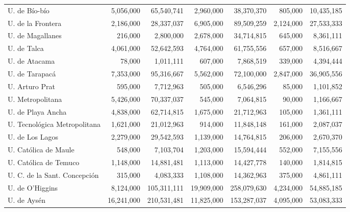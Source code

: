 \begin{tabular}{l rr rr rr}
U. de Bío-bío                  &     5,056,000 &      65,540,741 &     2,960,000 &      38,370,370 &       805,000 &      10,435,185 \\
U. de la Frontera              &     2,186,000 &      28,337,037 &     6,905,000 &      89,509,259 &     2,124,000 &      27,533,333 \\
U. de Magallanes               &       216,000 &       2,800,000 &     2,678,000 &      34,714,815 &       645,000 &       8,361,111 \\
U. de Talca                    &     4,061,000 &      52,642,593 &     4,764,000 &      61,755,556 &       657,000 &       8,516,667 \\
U. de Atacama                  &        78,000 &       1,011,111 &       607,000 &       7,868,519 &       339,000 &       4,394,444 \\
U. de Tarapacá                 &     7,353,000 &      95,316,667 &     5,562,000 &      72,100,000 &     2,847,000 &      36,905,556 \\
U. Arturo Prat                 &       595,000 &       7,712,963 &       505,000 &       6,546,296 &        85,000 &       1,101,852 \\
U. Metropolitana               &     5,426,000 &      70,337,037 &       545,000 &       7,064,815 &        90,000 &       1,166,667 \\
U. de Playa Ancha              &     4,838,000 &      62,714,815 &     1,675,000 &      21,712,963 &       105,000 &       1,361,111 \\
U. Tecnológica Metropolitana   &     1,621,000 &      21,012,963 &       914,000 &      11,848,148 &       161,000 &       2,087,037 \\
U. de Los Lagos                &     2,279,000 &      29,542,593 &     1,139,000 &      14,764,815 &       206,000 &       2,670,370 \\
U. Católica de Maule           &       548,000 &       7,103,704 &     1,203,000 &      15,594,444 &       552,000 &       7,155,556 \\
U. Católica de Temuco          &     1,148,000 &      14,881,481 &     1,113,000 &      14,427,778 &       140,000 &       1,814,815 \\
U. C. de la Sant. Concepción   &       315,000 &       4,083,333 &     1,108,000 &      14,362,963 &       375,000 &       4,861,111 \\
U. de O'Higgins                &     8,124,000 &     105,311,111 &    19,909,000 &     258,079,630 &     4,234,000 &      54,885,185 \\
U. de Aysén                    &    16,241,000 &     210,531,481 &    11,825,000 &     153,287,037 &     4,095,000 &      53,083,333 \\
\hline
\end{tabular}
